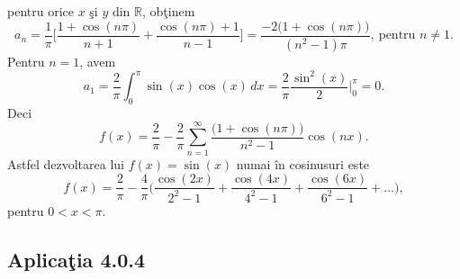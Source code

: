 \documentclass[a4paper,openany,12pt]{report}
\begin{document}
pentru orice $x$ \c si $y$ din $\mathbb{R}$, ob\c tinem
\begin{equation*}
a_n=\frac{1}{\pi}\Bigg[\frac{1+ \cos(n\pi)}{n+1}+\frac{\cos(n\pi)+1}{n-1}\Bigg] = \frac{-2\Big(1+\cos(n\pi)\Big)}{(n^2-1)\pi},\: \text{pentru }n \neq 1.
\end{equation*}
Pentru $n=1$, avem
\begin{equation*}
a_1=\frac{2}{\pi}\int_0^{\pi}\sin(x)\cos(x)\, dx=\frac{2}{\pi}\frac{\sin^2(x)}{2}\bigg|_0^\pi=0.
\end{equation*}
Deci
\begin{equation*}
f(x)=\frac{2}{\pi} -\frac{2}{\pi}\sum_{n=1}^\infty\frac{\Big(1+\cos(n\pi)\Big)}{n^2-1}\cos(nx).
\end{equation*}
Astfel dezvoltarea lui $f(x)=\sin(x)$ numai \^ in cosinusuri este
\begin{equation*}
f(x)=\frac{2}{\pi}-\frac{4}{\pi}\bigg(\frac{\cos(2x)}{2^2-1}+\frac{\cos(4x)}{4^2-1}+\frac{\cos(6x)}{6^2-1}+...\bigg),
\end{equation*}
pentru $0<x<\pi$.



\subsection*{Aplica\c tia 4.0.4}
\end{document}
